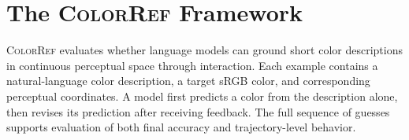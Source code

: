 \documentclass[11pt]{article}
\begin{document}







\section{The \textsc{ColorRef} Framework}
\label{sec:colorref}

\textsc{ColorRef} evaluates whether language models can ground short color
descriptions in continuous perceptual space through interaction. Each
example contains a natural-language color description, a target sRGB color,
and corresponding perceptual coordinates. A model first predicts a color
from the description alone, then revises its prediction after receiving
feedback. The full sequence of guesses supports evaluation of both final
accuracy and trajectory-level behavior.
\end{document}
